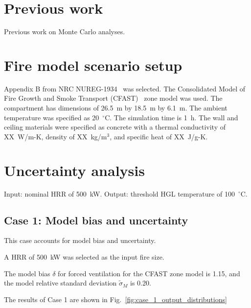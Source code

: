 \documentclass[12pt]{article}
\begin{document}
\section{Previous work}
\label{sec:previous_work}

Previous work on Monte Carlo analyses.


\section{Fire model scenario setup}
\label{sec:fire_model_scenario_setup}

Appendix B from NRC NUREG-1934~\cite{NUREG_1934} was selected. The Consolidated Model of Fire Growth and Smoke Transport (CFAST)~\cite{CFAST_Users_Guide_6} zone model was used. The compartment has dimensions of 26.5~m by 18.5~m by 6.1~m. The ambient temperature was specified as 20~$^\circ$C. The simulation time is 1~h. The wall and ceiling materials were specified as concrete with a thermal conductivity of XX~W/m-K, density of XX~kg/m$^3$, and specific heat of XX~J/g-K.


\section{Uncertainty analysis}
\label{sec:uncertainty_analysis}

Input: nominal HRR of 500~kW.
Output: threshold HGL temperature of 100~$^\circ$C.

\subsection{Case 1: Model bias and uncertainty}

This case accounts for model bias and uncertainty.

A HRR of 500~kW was selected as the input fire size.

The model bias $\delta$ for forced ventilation for the CFAST zone model is 1.15, and the model relative standard deviation $\widetilde\sigma_M$ is 0.20.

The results of Case 1 are shown in Fig.~\ref{fig:case_1_output_distributions}
\end{document}
